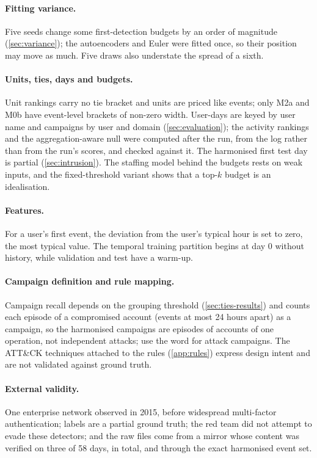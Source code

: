 \documentclass[11pt,a4paper]{article}
\begin{document}
\paragraph{Fitting variance.} Five seeds change some first-detection budgets by an order of magnitude (\cref{sec:variance}); the autoencoders and Euler were fitted once, so their position may move as much. Five draws also understate the spread of a sixth.

\paragraph{Units, ties, days and budgets.} Unit rankings carry no tie bracket and units are priced like events; only M2a and M0b have event-level brackets of non-zero width. User-days are keyed by user name and campaigns by user and domain (\cref{sec:evaluation}); the activity rankings and the aggregation-aware null were computed after the run, from the log rather than from the run's scores, and checked against it. The harmonised first test day is partial (\cref{sec:intrusion}). The staffing model behind the budgets rests on weak inputs, and the fixed-threshold variant shows that a top-$k$ budget is an idealisation.

\paragraph{Features.} For a user's first event, the deviation from the user's typical hour is set to zero, the most typical value. The temporal training partition begins at day 0 without history, while validation and test have a warm-up.

\paragraph{Campaign definition and rule mapping.} Campaign recall depends on the grouping threshold (\cref{sec:ties-results}) and counts each episode of a compromised account (events at most 24 hours apart) as a campaign, so the \HarmTestCampaigns{} harmonised campaigns are episodes of \HarmTestAccounts{} accounts of one operation, not independent attacks; \textcite{zhao2026gids} use the word for attack campaigns. The ATT\&CK techniques attached to the rules (\cref{app:rules}) express design intent and are not validated against ground truth.

\paragraph{External validity.} One enterprise network observed in 2015, before widespread multi-factor authentication; labels are a partial ground truth; the red team did not attempt to evade these detectors; and the raw files come from a mirror whose content was verified on three of 58 days, in total, and through the exact harmonised event set.
\end{document}
